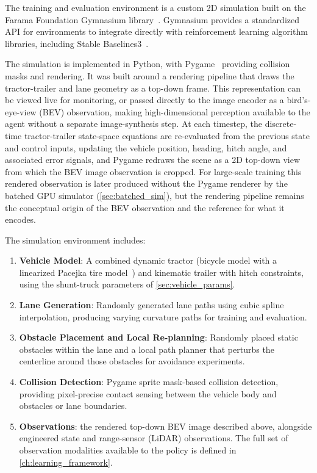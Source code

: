 The training and evaluation environment is a custom 2D simulation built on the Farama Foundation Gymnasium library~\cite{towers2024gymnasium}. Gymnasium provides a standardized API for environments to integrate directly with reinforcement learning algorithm libraries, including Stable Baselines3~\cite{raffin2021sb3}.

The simulation is implemented in Python, with Pygame~\cite{pygame} providing collision masks and rendering. It was built around a rendering pipeline that draws the tractor-trailer and lane geometry as a top-down frame. This representation can be viewed live for monitoring, or passed directly to the image encoder as a bird's-eye-view (BEV) observation, making high-dimensional perception available to the agent without a separate image-synthesis step. At each timestep, the discrete-time tractor-trailer state-space equations are re-evaluated from the previous state and control inputs, updating the vehicle position, heading, hitch angle, and associated error signals, and Pygame redraws the scene as a 2D top-down view from which the BEV image observation is cropped. For large-scale training this rendered observation is later produced without the Pygame renderer by the batched GPU simulator (\cref{sec:batched_sim}), but the rendering pipeline remains the conceptual origin of the BEV observation and the reference for what it encodes.

The simulation environment includes:

\begin{enumerate}
    \item \textbf{Vehicle Model}: A combined dynamic tractor (bicycle model with a linearized Pacejka tire model~\cite{pacejka2012tyre}) and kinematic trailer with hitch constraints, using the shunt-truck parameters of \cref{sec:vehicle_params}.
    \item \textbf{Lane Generation}: Randomly generated lane paths using cubic spline interpolation, producing varying curvature paths for training and evaluation.
    \item \textbf{Obstacle Placement and Local Re-planning}: Randomly placed static obstacles within the lane and a local path planner that perturbs the centerline around those obstacles for avoidance experiments.
    \item \textbf{Collision Detection}: Pygame sprite mask-based collision detection, providing pixel-precise contact sensing between the vehicle body and obstacles or lane boundaries.
    \item \textbf{Observations}: the rendered top-down BEV image described above, alongside engineered state and range-sensor (LiDAR) observations. The full set of observation modalities available to the policy is defined in \cref{ch:learning_framework}.
\end{enumerate}

